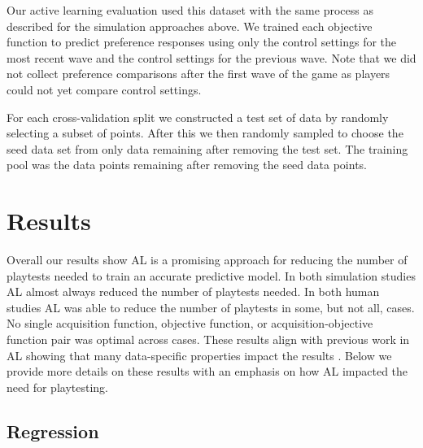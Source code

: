 \documentclass{sig-alternate}
\begin{document}

Our active learning evaluation used this dataset with the same process as described for the simulation approaches above.
We trained each objective function to predict preference responses using only the control settings for the most recent wave and the control settings for the previous wave.
Note that we did not collect preference comparisons after the first wave of the game as players could not yet compare control settings.

For each cross-validation split we constructed a test set of data by randomly selecting a subset of points.
After this we then randomly sampled to choose the seed data set from only data remaining after removing the test set.
The training pool was the data points remaining after removing the seed data points.



\section{Results}

Overall our results show AL is a promising approach for reducing the number of playtests needed to train an accurate predictive model.
In both simulation studies AL almost always reduced the number of playtests needed. %
In both human studies AL was able to reduce the number of playtests in some, but not all, cases.
No single acquisition function, objective function, or acquisition-objective function pair was optimal across cases.
These results align with previous work in AL showing that many data-specific properties impact the results \cite{schein2007:al-logreg-eval}.
Below we provide more details on these results with an emphasis on how AL impacted the need for playtesting.


\subsection{Regression}
\end{document}
